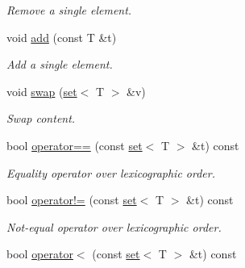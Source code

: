 \begin{DoxyCompactItemize}
\begin{DoxyCompactList}\small\item\em Remove a single element. \end{DoxyCompactList}\item 
void \hyperlink{classmerlin_1_1set_a12ca303df4af43659a892188eeda5272}{add} (const T \&t)\hypertarget{classmerlin_1_1set_a12ca303df4af43659a892188eeda5272}{}\label{classmerlin_1_1set_a12ca303df4af43659a892188eeda5272}

\begin{DoxyCompactList}\small\item\em Add a single element. \end{DoxyCompactList}\item 
void \hyperlink{classmerlin_1_1set_a52af645785b5b689c95ddb4d0e2774dc}{swap} (\hyperlink{classmerlin_1_1set}{set}$<$ T $>$ \&v)\hypertarget{classmerlin_1_1set_a52af645785b5b689c95ddb4d0e2774dc}{}\label{classmerlin_1_1set_a52af645785b5b689c95ddb4d0e2774dc}

\begin{DoxyCompactList}\small\item\em Swap content. \end{DoxyCompactList}\item 
bool \hyperlink{classmerlin_1_1set_a4721e77f71f2771f4c5b3873f4f3259f}{operator==} (const \hyperlink{classmerlin_1_1set}{set}$<$ T $>$ \&t) const \hypertarget{classmerlin_1_1set_a4721e77f71f2771f4c5b3873f4f3259f}{}\label{classmerlin_1_1set_a4721e77f71f2771f4c5b3873f4f3259f}

\begin{DoxyCompactList}\small\item\em Equality operator over lexicographic order. \end{DoxyCompactList}\item 
bool \hyperlink{classmerlin_1_1set_aafa2d337583501c51a520d46f64a3ef3}{operator!=} (const \hyperlink{classmerlin_1_1set}{set}$<$ T $>$ \&t) const \hypertarget{classmerlin_1_1set_aafa2d337583501c51a520d46f64a3ef3}{}\label{classmerlin_1_1set_aafa2d337583501c51a520d46f64a3ef3}

\begin{DoxyCompactList}\small\item\em Not-\/equal operator over lexicographic order. \end{DoxyCompactList}\item 
bool \hyperlink{classmerlin_1_1set_ae1e9ec4a3a6cc07b5a04b1e6605b7b22}{operator$<$} (const \hyperlink{classmerlin_1_1set}{set}$<$ T $>$ \&t) const \hypertarget{classmerlin_1_1set_ae1e9ec4a3a6cc07b5a04b1e6605b7b22}{}\label{classmerlin_1_1set_ae1e9ec4a3a6cc07b5a04b1e6605b7b22}


\end{DoxyCompactItemize}
